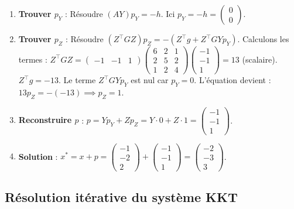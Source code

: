 \begin{enumerate}
    \item \textbf{Trouver $p_Y$} : Résoudre $(AY) p_Y = -h$. Ici $p_Y = -h = \begin{pmatrix} 0 \\ 0 \end{pmatrix}$.
    \item \textbf{Trouver $p_Z$} : Résoudre $(Z^\top G Z) p_Z = -(Z^\top g + Z^\top G Y p_Y)$.
    Calculons les termes : 
    $Z^\top G Z = \begin{pmatrix} -1 & -1 & 1 \end{pmatrix} \begin{pmatrix} 6 & 2 & 1 \\ 2 & 5 & 2 \\ 1 & 2 & 4 \end{pmatrix} \begin{pmatrix} -1 \\ -1 \\ 1 \end{pmatrix} = 13$ (scalaire).
    $Z^\top g = -13$.
    Le terme $Z^\top G Y p_Y$ est nul car $p_Y = 0$.
    L'équation devient : $13 p_Z = -(-13) \implies p_Z = 1$.
    \item \textbf{Reconstruire $p$} :
    $p = Y p_Y + Z p_Z = Y \cdot 0 + Z \cdot 1 = \begin{pmatrix} -1 \\ -1 \\ 1 \end{pmatrix}$.
    \item \textbf{Solution} :
    $x^* = x + p = \begin{pmatrix} -1 \\ -2 \\ 2 \end{pmatrix} + \begin{pmatrix} -1 \\ -1 \\ 1 \end{pmatrix} = \begin{pmatrix} -2 \\ -3 \\ 3 \end{pmatrix}$.
\end{enumerate}

\subsection{Résolution itérative du système KKT}


